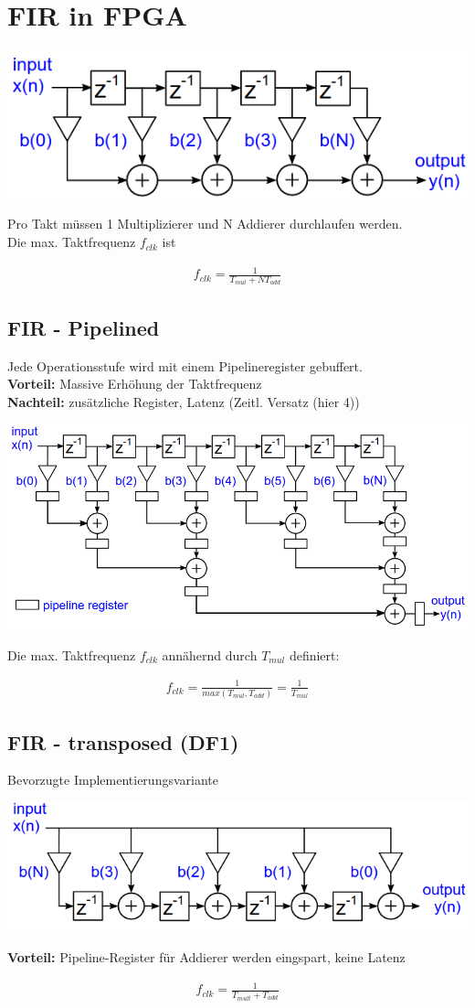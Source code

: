 \documentclass[10pt,a4paper]{article}
\begin{document}
\section{FIR in FPGA}
  \begin{center}
      \includegraphics[width=.35\textwidth]{./img/firfpga.png}
  \end{center}
Pro Takt müssen 1 Multiplizierer und N Addierer durchlaufen werden.\\
Die max. Taktfrequenz $f_{clk}$ ist
  \begin{mdframed}[style=exercise]
    \begin{align}
        f_{clk} = \frac{1}{T_{mul}+NT_{add}}
    \end{align}
  \end{mdframed}

\subsection{FIR - Pipelined} 
Jede Operationsstufe wird mit einem Pipelineregister gebuffert.\\
\textbf{Vorteil: } Massive Erhöhung der Taktfrequenz\\
\textbf{Nachteil: } zusätzliche Register, Latenz (Zeitl. Versatz (hier 4))
  \begin{center}
      \includegraphics[width=.35\textwidth]{./img/firpipeline.png}
  \end{center}
Die max. Taktfrequenz $f_{clk}$ annähernd durch $T_{mul}$ definiert:
  \begin{mdframed}[style=exercise]
    \begin{align}
        f_{clk} = \frac{1}{max(T_{mul},T_{add})} = \frac{1}{T_{mul}} 
    \end{align}
  \end{mdframed}

\subsection{FIR - transposed (DF1)}
Bevorzugte Implementierungsvariante
  \begin{center}
      \includegraphics[width=.35\textwidth]{./img/firtransposed.png}
  \end{center}
\textbf{Vorteil: } Pipeline-Register für Addierer werden eingspart, keine Latenz
  \begin{mdframed}[style=exercise]
    \begin{align}
        f_{clk}=\frac{1}{T_{mult}+T_{add}}
    \end{align}
  \end{mdframed}
\end{document}
